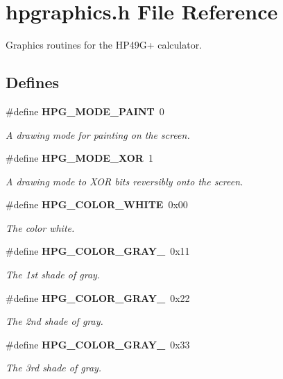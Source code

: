 \section{hpgraphics.h File Reference}
\label{hpgraphics_8h}
Graphics routines for the HP49G+ calculator. 


\subsection*{Defines}
\begin{CompactItemize}
\item 
\#define {\bf HPG\_\-MODE\_\-PAINT}\ 0
\begin{CompactList}\small\item\em A drawing mode for painting on the screen.\item\end{CompactList}\item 
\#define {\bf HPG\_\-MODE\_\-XOR}\ 1
\begin{CompactList}\small\item\em A drawing mode to XOR bits reversibly onto the screen.\item\end{CompactList}\item 
\#define {\bf HPG\_\-COLOR\_\-WHITE}\ 0x00
\begin{CompactList}\small\item\em The color white.\item\end{CompactList}\item 
\#define {\bf HPG\_\-COLOR\_\-GRAY\_}\ 0x11
\begin{CompactList}\small\item\em The 1st shade of gray.\item\end{CompactList}\item 
\#define {\bf HPG\_\-COLOR\_\-GRAY\_}\ 0x22
\begin{CompactList}\small\item\em The 2nd shade of gray.\item\end{CompactList}\item 
\#define {\bf HPG\_\-COLOR\_\-GRAY\_}\ 0x33
\begin{CompactList}\small\item\em The 3rd shade of gray.\item\end{CompactList}\item 

\end{CompactItemize}
